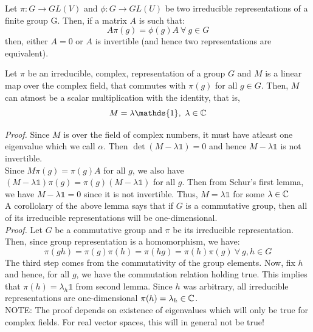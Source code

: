 \begin{lemma}
        Let $\pi: G\rightarrow GL(V)$ and $\phi: G\rightarrow GL(U)$ be two irreducible representations of a finite group G. Then, if a matrix $A$ is such that:$$A\pi(g) = \phi(g)A \ \forall \ g\in G$$ then, either $A=0$ or $A$ is invertible (and hence two representations are equivalent).
\end{lemma}

\begin{lemma}
    Let $\pi$ be an irreducible, complex, representation of a group $G$ and $M$ is a linear map over the complex field, that commutes with $\pi(g)$ for all $g\in G$. Then, $M$ can atmost be a scalar multiplication with the identity, that is, $$M=\lambda \mathds{1},\ \lambda\in \ce$$
\end{lemma}
\textit{Proof.} Since $M$ is over the field of complex numbers, it must have atleast one eigenvalue which we call $\alpha$. Then $\det(M-\lambda\mathds{1}) = 0$ and hence $M-\lambda\mathds{1}$ is not invertible. \\[0.2cm]
Since $M\pi(g) = \pi(g)A$ for all $g$, we also have $(M-\lambda\mathds{1})\pi(g) = \pi(g)(M-\lambda\mathds{1})$ for all $g$. Then from Schur's first lemma, we have $M-\lambda\mathds{1} = 0$ since it is not invertible. Thus, $M=\lambda\mathds{1}$ for some $\lambda\in \mathbb{C}$\\[0.2cm]
A corollolary of the above lemma says that if $G$ is a commutative group, then all of its irreducible representations will be one-dimensional.\\[0.2cm]
\textit{Proof.} Let $G$ be a commutative group and $\pi$ be its irreducible representation. Then, since group representation is a homomorphism, we have:
$$\pi(gh) = \pi(g)\pi(h) = \pi(hg) = \pi(h)\pi(g)\ \forall \ g,h\in G$$
The third step comes from the commutativity of the group elements. Now, fix $h$ and hence, for all $g$, we have the commutation relation holding true. This implies that $\pi(h) = \lambda_h \mathds{1}$ from second lemma. Since $h$ was arbitrary, all irreducible representations are one-dimensional $\pi(h) = \lambda_h \in \mathbb{C}$.\\[0.2cm]
NOTE: The proof depends on existence of eigenvalues which will only be true for complex fields. For real vector spaces, this will in general not be true!

